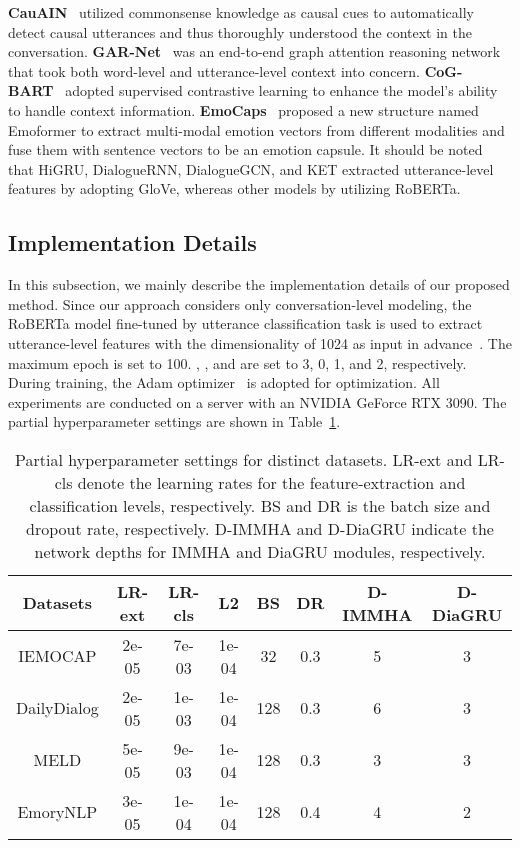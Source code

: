 \documentclass{SCIS2019}
\begin{document}
\textbf{CauAIN}~\cite{zhao2022cauain} utilized commonsense knowledge as causal cues to automatically detect causal utterances and thus thoroughly understood the context in the conversation.
\textbf{GAR-Net}~\cite{xu2022gar} was an end-to-end graph attention reasoning network that took both word-level and utterance-level context into concern.
\textbf{CoG-BART}~\cite{li2022contrast} adopted supervised contrastive learning to enhance the model's ability to handle context information.
\textbf{EmoCaps}~\cite{li2022emocaps} proposed a new structure named Emoformer to extract multi-modal emotion vectors from different modalities and fuse them with sentence vectors to be an emotion capsule.
It should be noted that HiGRU, DialogueRNN, DialogueGCN, and KET extracted utterance-level features by adopting GloVe, whereas other models by utilizing RoBERTa.

\subsection{Implementation Details}
In this subsection, we mainly describe the implementation details of our proposed method. Since our approach considers only conversation-level modeling, the RoBERTa model fine-tuned by utterance classification task is used to extract utterance-level features with the dimensionality of 1024 as input in advance~\cite{Ghosal2020}. The maximum epoch is set to 100. , ,  and  are set to 3, 0, 1, and 2, respectively. During training, the Adam optimizer~\cite{loshchilov2018decoupled} is adopted for optimization. All experiments are conducted on a server with an NVIDIA GeForce RTX 3090. The partial hyperparameter settings are shown in Table~\ref{tab:hyperparameter}.
\begin{table}[htbp]
    \centering
    \renewcommand{\arraystretch}{1.0}
    \setlength{\tabcolsep}{4.0pt}
    \caption{Partial hyperparameter settings for distinct datasets. LR-ext and LR-cls denote the learning rates for the feature-extraction and classification levels, respectively. BS and DR is the batch size and dropout rate, respectively. D-IMMHA and D-DiaGRU indicate the network depths for IMMHA and DiaGRU modules, respectively.}
    \begin{tabular}{c|ccccccc}
	\toprule
    Datasets &LR-ext &LR-cls &L2 &BS &DR &D-IMMHA &D-DiaGRU \\
	\hline
    IEMOCAP &2e-05 &7e-03 &1e-04 &32 &0.3 &5 &3 \\
	DailyDialog &2e-05 &1e-03 &1e-04 &128 &0.3 &6 &3 \\
    MELD &5e-05 &9e-03 &1e-04 &128 &0.3  &3 &3 \\
    EmoryNLP &3e-05 &1e-04 &1e-04 &128 &0.4  &4 &2 \\
    \bottomrule
    \end{tabular}
    \label{tab:hyperparameter}
\end{table}
\end{document}
